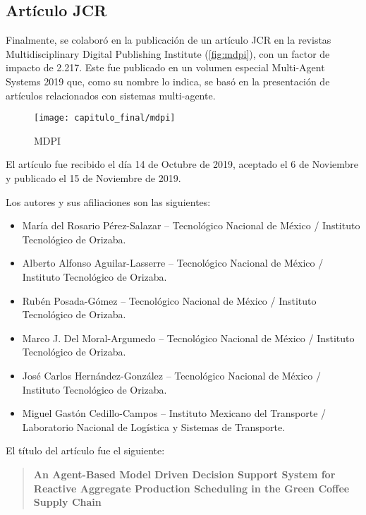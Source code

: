 \subsection{Artículo JCR}

Finalmente, se colaboró en la publicación de un artículo JCR en la revistas
Multidisciplinary Digital Publishing Institute (\autoref{fig:mdpi}), con un
factor de impacto de 2.217. Este fue publicado en un volumen especial
Multi-Agent Systems 2019 que, como su nombre lo indica, se basó en la
presentación de artículos relacionados con sistemas multi-agente.

\begin{figure}[H]
    \centering
    \texttt{[image: capitulo\_final/mdpi]}
    \caption{MDPI}\label{fig:mdpi}
\end{figure}

El artículo fue recibido el día 14 de Octubre de 2019, aceptado el 6 de Noviembre y 
publicado el 15 de Noviembre de 2019.

Los autores y sus afiliaciones son las siguientes:

\begin{itemize}
    \item María del Rosario Pérez-Salazar -- Tecnológico Nacional de México /
    Instituto Tecnológico de Orizaba.
    \item Alberto Alfonso Aguilar-Lasserre -- Tecnológico Nacional de México /
    Instituto Tecnológico de Orizaba.
    \item Rubén Posada-Gómez -- Tecnológico Nacional de México /
    Instituto Tecnológico de Orizaba.
    \item Marco J. Del Moral-Argumedo -- Tecnológico Nacional de México /
    Instituto Tecnológico de Orizaba.
    \item José Carlos Hernández-González -- Tecnológico Nacional de México /
    Instituto Tecnológico de Orizaba. 
    \item Miguel Gastón Cedillo-Campos -- Instituto Mexicano del Transporte /
    Laboratorio Nacional de Logística y Sistemas de Transporte.
\end{itemize}

El título del artículo fue el siguiente:

\begin{quotation}
\textbf{An Agent-Based Model Driven Decision Support System for Reactive
    Aggregate Production Scheduling in the Green Coffee Supply Chain}
\end{quotation}

